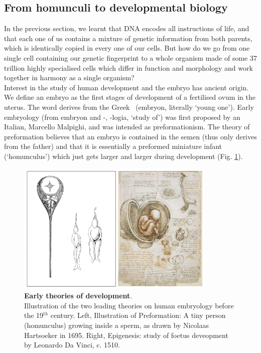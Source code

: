 \subsection{From homunculi to developmental biology}
\label{sec:history_developmental_biology}

In the previous section, we learnt that DNA encodes all instructions of life, and that each one of us contains a mixture of genetic information from both parents, which is identically copied in every one of our cells.
But how do we go from one single cell containing our genetic fingerprint to a whole organism made of some 37 trillion highly specialised cells which differ in function and morphology and work together in harmony as a single organism?\\

Interest in the study of human development and the embryo has ancient origin.
We define an embryo as the first stages of development of a fertilised ovum in the uterus.
The word derives from the Greek \textepsilon\textmu\textbeta\textrho\textupsilon\textomikron\textnu \ (embryon, literally `young one').
Early embryology (from embryon and -\textlambda\textomikron\textgamma\textiota\textalpha, -logia, `study of') was first proposed by an Italian, Marcello Malpighi, and was intended as preformationism.
The theory of preformation believes that an embryo is contained in the semen (thus only derives from the father) and that it is essentially a preformed miniature infant (`homunculus') which just gets larger and larger during development (Fig. \ref{fig:early_embryology}).\\

\begin{figure}
\includegraphics[width=9.5cm]{Chapter1/Fig/Early_theories_development.png}
\caption[Early theories of development]{\textbf{Early theories of development}.\\
Illustration of the two leading theories on human embryology before the 19$^{th}$ century.
Left, Illustration of Preformation: 
A tiny person (homunculus) growing inside a sperm, as drawn by Nicolaas Hartsoeker in 1695.
Right, Epigenesis: study of foetus deveopment by Leonardo Da Vinci, c. 1510.}
\label{fig:early_embryology}
\end{figure}

